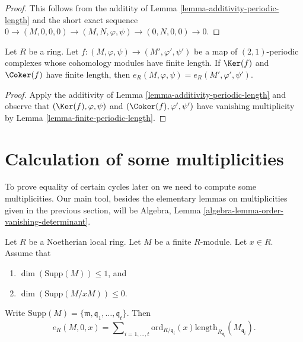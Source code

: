 \begin{proof}
This follows from the additity of
Lemma \ref{lemma-additivity-periodic-length}
and the short exact sequence
$0 \to (M, 0, 0, 0) \to (M, N, \varphi, \psi) \to (0, N, 0, 0) \to 0$.
\end{proof}

\begin{lemma}
\label{lemma-compare-periodic-lengths}
Let $R$ be a ring. Let $f : (M, \varphi, \psi) \to (M', \varphi', \psi')$
be a map of $(2, 1)$-periodic complexes whose cohomology modules
have finite length. If $\Ker(f)$ and $\Coker(f)$ have finite length,
then $e_R(M, \varphi, \psi) = e_R(M', \varphi', \psi')$.
\end{lemma}

\begin{proof}
Apply the additivity of Lemma \ref{lemma-additivity-periodic-length}
and observe that $(\Ker(f), \varphi, \psi)$ and
$(\Coker(f), \varphi', \psi')$ have vanishing multiplicity by
Lemma \ref{lemma-finite-periodic-length}.
\end{proof}




\section{Calculation of some multiplicities}
\label{section-calculation}

\noindent
To prove equality of certain cycles later on we need to
compute some multiplicities. Our main tool, besides the
elementary lemmas on multiplicities given in the previous section,
will be Algebra, Lemma \ref{algebra-lemma-order-vanishing-determinant}.

\begin{lemma}
\label{lemma-length-multiplication}
Let $R$ be a Noetherian local ring.
Let $M$ be a finite $R$-module. Let $x \in R$. Assume that
\begin{enumerate}
\item $\dim(\text{Supp}(M)) \leq 1$, and
\item $\dim(\text{Supp}(M/xM)) \leq 0$.
\end{enumerate}
Write
$\text{Supp}(M) = \{\mathfrak m, \mathfrak q_1, \ldots, \mathfrak q_t\}$.
Then
$$
e_R(M, 0, x) =
\sum\nolimits_{i = 1, \ldots, t}
\text{ord}_{R/\mathfrak q_i}(x)
\text{length}_{R_{\mathfrak q_i}}(M_{\mathfrak q_i}).
$$
\end{lemma}

